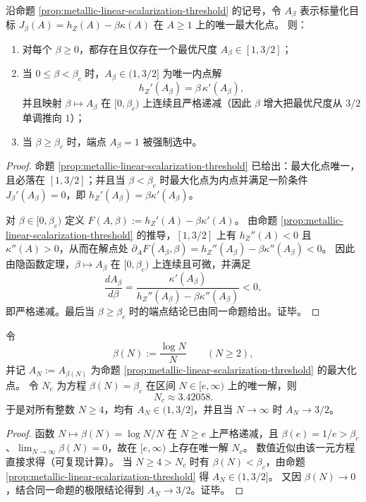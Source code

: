 \begin{corollary}\label{cor:metallic-pareto-scale-law}
沿命题 \ref{prop:metallic-linear-scalarization-threshold} 的记号，令 \(A_\beta\) 表示标量化目标
\(
J_\beta(A)=h_Z(A)-\beta\kappa(A)
\)
在 \(A\ge 1\) 上的唯一最大化点。
则：
\begin{enumerate}
  \item 对每个 \(\beta\ge 0\)，都存在且仅存在一个最优尺度 \(A_\beta\in[1,3/2]\)；
  \item 当 \(0\le \beta<\beta_c\) 时，\(A_\beta\in(1,3/2]\) 为唯一内点解
  \[
  h_Z'(A_\beta)=\beta\,\kappa'(A_\beta),
  \]
  并且映射 \(\beta\mapsto A_\beta\) 在 \([0,\beta_c)\) 上连续且严格递减（因此 \(\beta\) 增大把最优尺度从 \(3/2\) 单调推向 \(1\)）；
  \item 当 \(\beta\ge \beta_c\) 时，端点 \(A_\beta=1\) 被强制选中。
\end{enumerate}
\end{corollary}
\begin{proof}
命题 \ref{prop:metallic-linear-scalarization-threshold} 已给出：最大化点唯一，且必落在 \([1,3/2]\)；并且当 \(\beta<\beta_c\) 时最大化点为内点并满足一阶条件 \(J_\beta'(A_\beta)=0\)，即 \(h_Z'(A_\beta)=\beta\kappa'(A_\beta)\)。
\par
对 \(\beta\in[0,\beta_c)\) 定义
\(
F(A,\beta):=h_Z'(A)-\beta\kappa'(A)
\)。
由命题 \ref{prop:metallic-linear-scalarization-threshold} 的推导，\([1,3/2]\) 上有 \(h_Z''(A)<0\) 且 \(\kappa''(A)>0\)，从而在解点处
\(
\partial_A F(A_\beta,\beta)=h_Z''(A_\beta)-\beta\kappa''(A_\beta)<0
\)。
因此由隐函数定理，\(\beta\mapsto A_\beta\) 在 \([0,\beta_c)\) 上连续且可微，并满足
\[
\frac{dA_\beta}{d\beta}
=\frac{\kappa'(A_\beta)}{h_Z''(A_\beta)-\beta\kappa''(A_\beta)}<0,
\]
即严格递减。最后当 \(\beta\ge\beta_c\) 时的端点结论已由同一命题给出。证毕。
\end{proof}

\begin{corollary}[把权重绑定到有限样本证书的样本量阈值]\label{cor:metallic-sample-threshold}
令
\[
\beta(N):=\frac{\log N}{N}\qquad(N\ge 2),
\]
并记 \(A_N:=A_{\beta(N)}\) 为命题 \ref{prop:metallic-linear-scalarization-threshold} 的最大化点。
令 \(N_c\) 为方程 \(\beta(N)=\beta_c\) 在区间 \(N\in[e,\infty)\) 上的唯一解，则
\[
N_c\approx 3.42058.
\]
于是对所有整数 \(N\ge 4\)，均有 \(A_N\in(1,3/2]\)，并且当 \(N\to\infty\) 时 \(A_N\to 3/2\)。
\end{corollary}
\begin{proof}
函数 \(N\mapsto \beta(N)=\log N/N\) 在 \(N\ge e\) 上严格递减，且 \(\beta(e)=1/e>\beta_c\)、\(\lim_{N\to\infty}\beta(N)=0\)，故在 \([e,\infty)\) 上存在唯一解 \(N_c\)。
数值近似由该一元方程直接求得（可复现计算）。
当 \(N\ge 4>N_c\) 时有 \(\beta(N)<\beta_c\)，由命题 \ref{prop:metallic-linear-scalarization-threshold} 得 \(A_N\in(1,3/2]\)。
又因 \(\beta(N)\to 0\)，结合同一命题的极限结论得到 \(A_N\to 3/2\)。证毕。
\end{proof}

